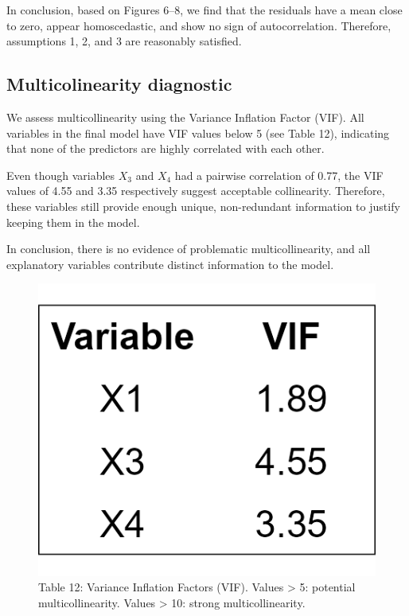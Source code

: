 \documentclass[
  12pt,
]{article}
\begin{document}
In conclusion, based on Figures 6--8, we find that the residuals have a
mean close to zero, appear homoscedastic, and show no sign of
autocorrelation. Therefore, assumptions 1, 2, and 3 are reasonably
satisfied.

\vspace{-0.5em}

\subsection{Multicolinearity
diagnostic}\label{multicolinearity-diagnostic}

\vspace{-1em}
\begin{minipage}{0.6\textwidth}
\vspace{0.3cm}
We assess multicollinearity using the Variance Inflation Factor (VIF). All variables in the final model have VIF values below 5 (see Table 12), indicating that none of the predictors are highly correlated with each other.

Even though variables \(X_3\) and \(X_4\) had a pairwise correlation of 0.77, the VIF values of 4.55 and 3.35 respectively suggest acceptable collinearity. Therefore, these variables still provide enough unique, non-redundant information to justify keeping them in the model.\

In conclusion, there is no evidence of problematic multicollinearity, and all explanatory variables contribute distinct information to the model.

\end{minipage}
\hfill
\begin{minipage}{0.37\textwidth}
\vspace{-3em}
  \begin{figure}[H]
    \centering
    \includegraphics[width=0.6\linewidth]{figures/vif_table.png}
    \vspace{-0.5em}
    \captionsetup{font=normalsize}
    \caption*{Table 12: Variance Inflation Factors (VIF). Values > 5: potential multicollinearity. Values > 10: strong multicollinearity.}
  \end{figure}
\end{minipage}
\end{document}
